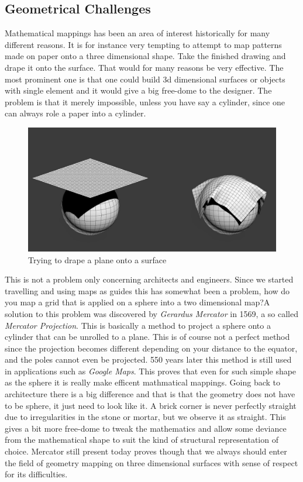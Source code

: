 \subsection{Geometrical Challenges}


Mathematical mappings has been an area of interest historically for many different reasons.  It is for instance very tempting to attempt to map patterns made on paper onto a three dimensional shape. Take the finished drawing and drape it onto the surface. That would for many reasons be very effective. The most prominent one is that one could build 3d dimensional surfaces or objects with single element and it would give a big free-dome to the designer. The problem is that it merely impossible, unless you have say a cylinder, since  one can always role a paper into a cylinder. 

\begin{figure}[H]
\centering
\includegraphics[width=0.8\linewidth ]{figure/Introduction/drape.jpg}
\caption{Trying to drape a plane onto a surface }
\end{figure}

This is not a problem only concerning architects and engineers. Since we started travelling and using maps as guides this has somewhat been a problem, how do you map a grid that is applied on a sphere into a two dimensional map?A solution to this problem was discovered by  \textit{Gerardus Mercator} in 1569, a so called \textit{Mercator Projection}\cite{ref:merc}. This is basically a method to project a sphere onto a cylinder that can be unrolled to a plane. This is of course not a perfect method since the projection becomes different depending on your distance to the equator, and the poles cannot even be projected. 550 years later this method is still used in applications such as \textit{Google Maps}\cite{ref:maps}. This proves that even for such simple shape as the sphere it is really make efficent mathmatical mappings. Going back to architecture there is a big difference and that is that the geometry does not have to be sphere, it just need to look like it. A brick corner is never perfectly straight due to irregularities in the stone or mortar, but we observe it as straight. This gives a bit more free-dome to tweak the mathematics and allow some deviance from the mathematical shape to suit the kind of structural representation of choice. Mercator still present today proves though that we always should enter the field of geometry mapping on three dimensional surfaces with sense of respect for its difficulties.

